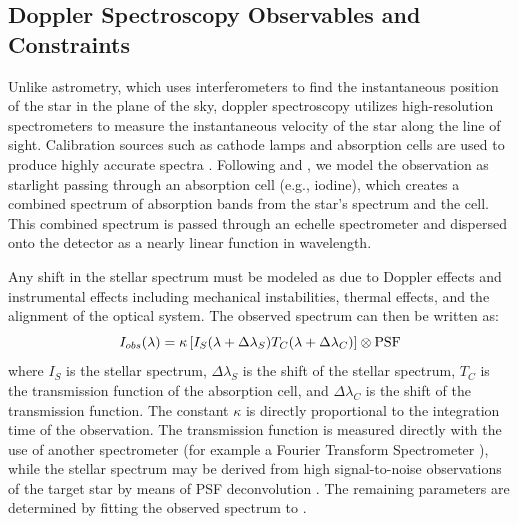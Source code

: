 \subsection{Doppler Spectroscopy Observables and Constraints}\label{sec:rv_inst_obs}
Unlike astrometry, which uses interferometers to find the instantaneous position of the star in the plane of the sky, doppler spectroscopy utilizes high-resolution spectrometers to measure the instantaneous velocity of the star along the line of sight.  Calibration sources such as cathode lamps and absorption cells are used to produce highly accurate spectra \citep{vogt1994hires}.  Following \citet{marcy1992precision} and \citet{butler1996attaining}, we model the observation as starlight passing through an absorption cell (e.g., iodine), which creates a combined spectrum of absorption bands from the star's spectrum and the cell.  This combined spectrum is passed through an echelle spectrometer \citep{vogt1987lick} and dispersed onto the detector as a nearly linear function in wavelength.

Any shift in the stellar spectrum must be modeled as due to Doppler effects and instrumental effects including mechanical instabilities, thermal effects, and the alignment of the optical system.  The observed spectrum can then be written as:
\begin{equation}\label{eq:obsSpectrum}
I_{obs}(\lambda) = \kappa \left[ I_S(\lambda + \Delta\lambda_S)T_C(\lambda + \Delta\lambda_C) \right] \otimes \mathrm{PSF}
\end{equation}
where $I_S$ is the stellar spectrum, $\Delta\lambda_S$ is the shift of the stellar spectrum, $T_C$ is the transmission function of the absorption cell, and $\Delta\lambda_C$ is the shift of the transmission function. The constant $\kappa$ is directly proportional to the integration time of the observation.  The transmission function is measured directly with the use of another spectrometer (for example a Fourier Transform Spectrometer \citep{davis2001fourier}), while the stellar spectrum may be derived from high signal-to-noise observations of the target star by means of PSF deconvolution \citep{gilliland1992resolution}.  The remaining parameters are determined by fitting the observed spectrum to .

